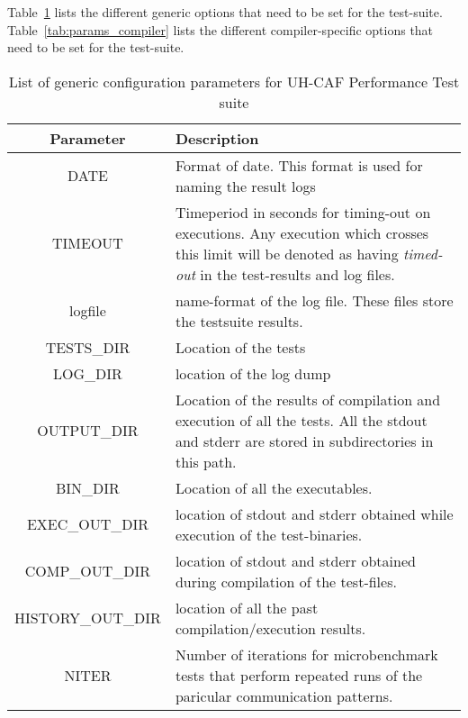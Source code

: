 \label{sec:config}
Table~\ref{tab:params_generic} lists the different generic options that need to be set for the test-suite. 
Table~\ref{tab:params_compiler} lists the different compiler-specific options that need to be set for the test-suite. 

\begin{table}[h!]
\small
\caption{List of generic configuration parameters for UH-CAF Performance Test suite }
\label{tab:params_generic}
\begin{tabular}{|c|p{6cm}|}
\hline
Parameter & Description \\\hline
DATE & Format of date. This format is used for naming the result logs \\\hline
TIMEOUT & Timeperiod in seconds for timing-out on executions. Any execution which crosses this limit will be denoted as having \emph{timed-out} in the test-results and log files. \\\hline 
logfile & name-format of the log file. These files store the testsuite results. \\\hline
TESTS\_DIR & Location of the tests \\\hline
LOG\_DIR & location of the log dump \\\hline
OUTPUT\_DIR & Location of the  results of compilation and execution of all the tests. All the stdout and stderr are stored in subdirectories  in this path. \\\hline
BIN\_DIR & Location of all the executables.  \\\hline
EXEC\_OUT\_DIR & location of stdout and stderr obtained while execution of the test-binaries. \\\hline
COMP\_OUT\_DIR & location of stdout and stderr obtained during compilation of the test-files. \\\hline
HISTORY\_OUT\_DIR & location of all the past compilation/execution results. \\\hline
NITER & Number of iterations for microbenchmark tests that perform repeated runs of the paricular communication patterns. \\\hline
\end{tabular}
\end{table}

